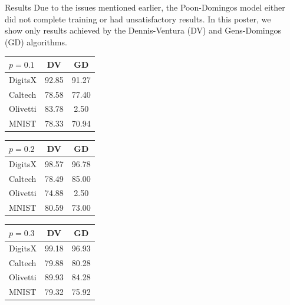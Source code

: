 \documentclass[final,hyperref={pdfpagelabels=false},notheorems]{beamer}
\theoremstyle{thesisstyle}
\newcommand{\pskip}{\vskip 0.5cm}
\begin{document}
\begin{frame}[t]
\begin{columns}[t]
\begin{column}{.5225\textwidth}
    \begin{block}{Results}
      Due to the issues mentioned earlier, the Poon-Domingos model either did not complete training
      or had unsatisfactory results. In this poster, we show only results achieved by the
      Dennis-Ventura (DV) and Gens-Domingos (GD) algorithms.\pskip

      \begin{table}[h]
        \begin{tabular}{l|c|c}
          $p=0.1$ & DV & GD\\
          \hline
          DigitsX & 92.85 & 91.27\\
          Caltech & 78.58 & 77.40\\
          Olivetti& 83.78 & 2.50\\
          MNIST   & 78.33 & 70.94\\
        \end{tabular}\hspace{2.5cm}
        \begin{tabular}{l|c|c}
          $p=0.2$ & DV & GD\\
          \hline
          DigitsX & 98.57 & 96.78\\
          Caltech & 78.49 & 85.00\\
          Olivetti& 74.88 & 2.50\\
          MNIST   & 80.59 & 73.00\\
        \end{tabular}\hspace{2.5cm}
        \begin{tabular}{l|c|c}
          $p=0.3$ & DV & GD\\
          \hline
          DigitsX & 99.18 & 96.93\\
          Caltech & 79.88 & 80.28\\
          Olivetti& 89.93 & 84.28\\
          MNIST   & 79.32 & 75.92\\
        \end{tabular}
      \end{table}
    \end{block}

  \end{column}


  \begin{column}{.02\textwidth}\end{column} %


\end{columns}
\end{frame}
\end{document}

